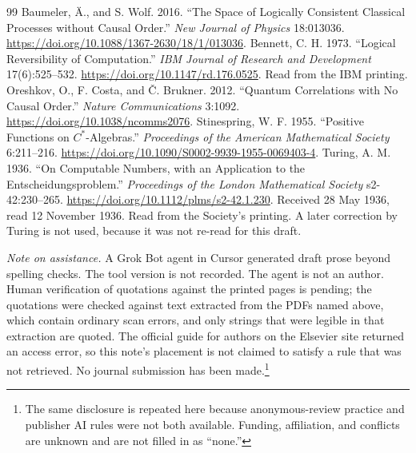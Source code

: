 \documentclass[12pt]{article}
\begin{document}
\begin{thebibliography}{99}
 Baumeler, \"A., and S. Wolf. 2016. ``The Space of Logically Consistent Classical Processes without Causal Order.'' \textit{New Journal of Physics} 18:013036. \url{https://doi.org/10.1088/1367-2630/18/1/013036}.
 Bennett, C. H. 1973. ``Logical Reversibility of Computation.'' \textit{IBM Journal of Research and Development} 17(6):525--532. \url{https://doi.org/10.1147/rd.176.0525}. Read from the IBM printing.
 Oreshkov, O., F. Costa, and \v{C}. Brukner. 2012. ``Quantum Correlations with No Causal Order.'' \textit{Nature Communications} 3:1092. \url{https://doi.org/10.1038/ncomms2076}.
 Stinespring, W. F. 1955. ``Positive Functions on $C^{*}$-Algebras.'' \textit{Proceedings of the American Mathematical Society} 6:211--216. \url{https://doi.org/10.1090/S0002-9939-1955-0069403-4}.
 Turing, A. M. 1936. ``On Computable Numbers, with an Application to the Entscheidungsproblem.'' \textit{Proceedings of the London Mathematical Society} s2-42:230--265. \url{https://doi.org/10.1112/plms/s2-42.1.230}. Received 28 May 1936, read 12 November 1936. Read from the Society's printing. A later correction by Turing is not used, because it was not re-read for this draft.
\end{thebibliography}

\bigskip
\noindent\textit{Note on assistance.} A Grok Bot agent in Cursor generated draft prose beyond spelling checks. The tool version is not recorded. The agent is not an author. Human verification of quotations against the printed pages is pending; the quotations were checked against text extracted from the PDFs named above, which contain ordinary scan errors, and only strings that were legible in that extraction are quoted. The official guide for authors on the Elsevier site returned an access error, so this note's placement is not claimed to satisfy a rule that was not retrieved. No journal submission has been made.\footnote{The same disclosure is repeated here because anonymous-review practice and publisher AI rules were not both available. Funding, affiliation, and conflicts are unknown and are not filled in as ``none.''}
\end{document}
